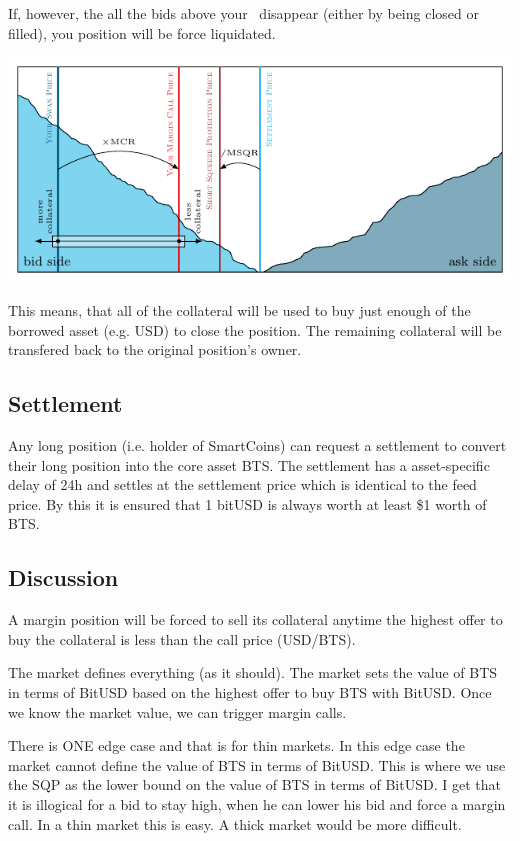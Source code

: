 If, however, the all the bids above your \MCP\ disappear (either by being closed
or filled), you position will be force liquidated. 

\includegraphics[width=.9\linewidth,page=4]{figures/dex-engine-def.pdf}

This means, that all of the collateral will be used to buy just enough of the
borrowed asset (e.g. USD) to close the position. The remaining collateral will
be transfered back to the original position's owner.

\subsection{Settlement}

Any long position (i.e. holder of SmartCoins) can request a settlement to
convert their long position into the core asset BTS. The settlement has a
asset-specific delay of 24h and settles at the settlement price which is
identical to the feed price. By this it is ensured that 1 bitUSD is always
worth at least \$1 worth of BTS.

\subsection{Discussion}

A margin position will be forced to sell its collateral anytime the highest
offer to buy the collateral is less than the call price (USD/BTS).

The market defines everything (as it should).
The market sets the value of BTS in terms of BitUSD based on the highest offer
to buy BTS with BitUSD.
Once we know the market value, we can trigger margin calls.

There is ONE edge case and that is for thin markets.  In this edge case the
market cannot define the value of BTS in terms of BitUSD.  This is where we use
the SQP as the lower bound on the value of BTS in terms of BitUSD.
I get that it is illogical for a bid to stay
high, when he can lower his bid and force a margin call.  In a thin market this
is easy. A thick market would be more difficult. 

